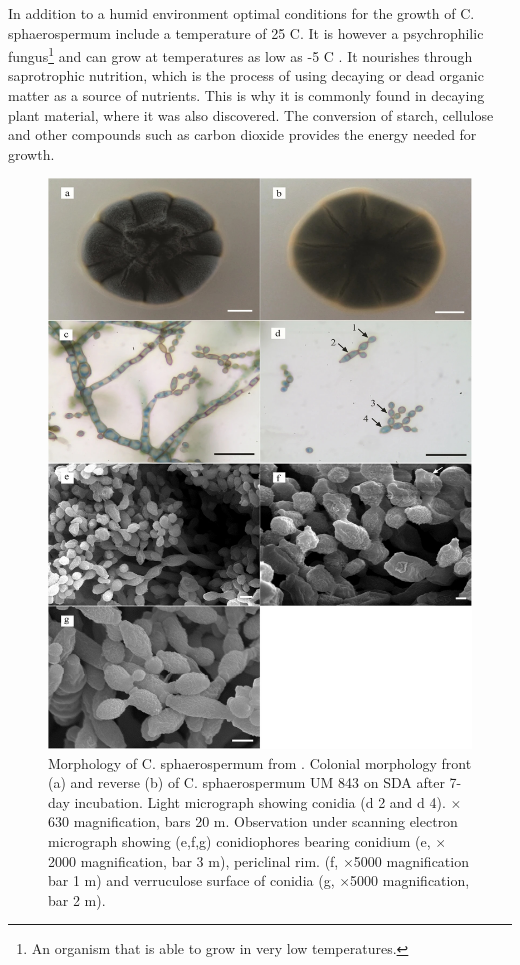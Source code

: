 In addition to a humid environment optimal conditions for the growth of C. sphaerospermum include a temperature of 25  \textdegree C. It is however a  psychrophilic fungus\footnote{An organism that is able to grow in very low temperatures.} and can grow at temperatures as low as -5 \textdegree C \cite{mould}. It nourishes through saprotrophic nutrition, which is the process of using decaying or dead organic matter as a source of nutrients. This is why it is commonly found in decaying plant material, where it was also discovered. The conversion of starch, cellulose and other compounds such as carbon dioxide provides the energy needed for growth.

\begin{figure}
    \centering
    \includegraphics[width=.85\textwidth]{images/mould.jpg}
    \caption[Morphology of C. sphaerospermum]{Morphology of C. sphaerospermum from \cite{morphology}. Colonial morphology front (a) and reverse (b) of C. sphaerospermum UM 843 on SDA after 7-day incubation. Light micrograph showing conidia (d 2 and d 4). $\times$630 magnification, bars 20 \textmu m. Observation under scanning electron micrograph showing (e,f,g) conidiophores bearing conidium (e, $\times$2000 magnification, bar 3 \textmu m), periclinal rim\footnotemark. (f, $\times$5000 magnification bar 1 \textmu m) and verruculose surface of conidia (g, $\times$5000 magnification, bar 2 \textmu m).}
    \label{fig:mould}
\end{figure}

